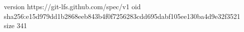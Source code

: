 version https://git-lfs.github.com/spec/v1
oid sha256:e15d979dd1b2868eeb843b4f0f7256283cdd695dabf105ee130ba4d9e32f3521
size 341
